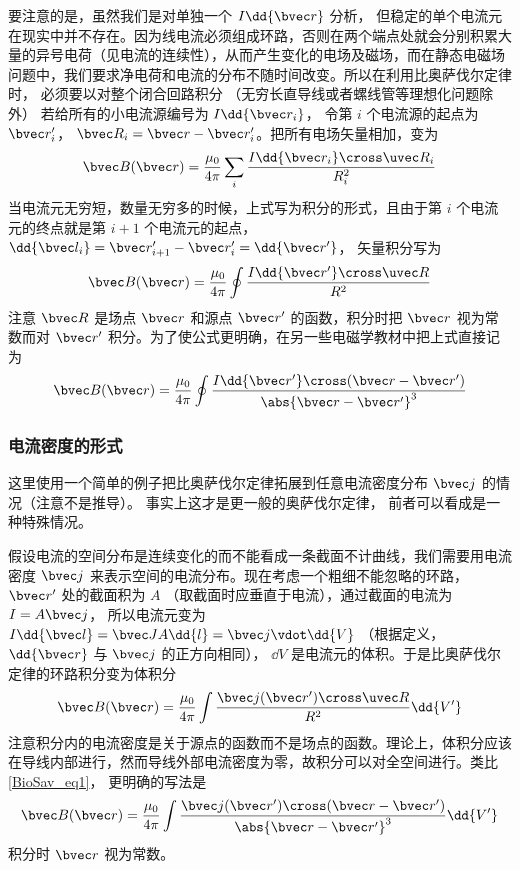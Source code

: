 要注意的是，虽然我们是对单独一个 $I\dd{\bvec r}$ 分析， 但稳定的单个电流元在现实中并不存在。因为线电流必须组成环路，否则在两个端点处就会分别积累大量的异号电荷（见电流的连续性），从而产生变化的电场及磁场，而在静态电磁场问题中，我们要求净电荷和电流的分布不随时间改变。所以在利用比奥萨伐尔定律时， 必须要以对整个闭合回路积分 （无穷长直导线或者螺线管等理想化问题除外）%
若给所有的小电流源编号为 $I\dd{\bvec r_i}$， 令第 $i$ 个电流源的起点为 $\bvec r'_i$， $\bvec R_i = \bvec r - \bvec r'_i$。把所有电场矢量相加，变为
\begin{equation}
\bvec B (\bvec r) = \frac{\mu_0}{4\pi} \sum\limits_i \frac{I \dd{\bvec r_i} \cross \uvec R_i}{R_i^2}
\end{equation}
当电流元无穷短，数量无穷多的时候，上式写为积分的形式，且由于第 $i$ 个电流元的终点就是第 $i+1$ 个电流元的起点， $\dd{\bvec l_i} = \bvec r'_{i + 1} - \bvec r'_i = \dd{\bvec r'}$， 矢量积分写为
\begin{equation}\label{BioSav_eq4}
\bvec B (\bvec r) = \frac{\mu_0}{4\pi} \oint \frac{I\dd{\bvec r'} \cross \uvec R}{R^2}
\end{equation}
注意 $\bvec R$ 是场点 $\bvec r$ 和源点 $\bvec r'$ 的函数，积分时把 $\bvec r$ 视为常数而对 $\bvec r'$ 积分。为了使公式更明确，在另一些电磁学教材中把上式直接记为
\begin{equation}\label{BioSav_eq1}
\bvec B(\bvec r) = \frac{\mu_0}{4\pi} \oint \frac{I \dd{\bvec r'} \cross (\bvec r - \bvec r')}{\abs{\bvec r - \bvec r'}^3}
\end{equation}


\subsubsection{电流密度的形式}
这里使用一个简单的例子把比奥萨伐尔定律拓展到任意电流密度分布 $\bvec j$ 的情况（注意不是推导）。 事实上这才是更一般的奥萨伐尔定律， 前者可以看成是一种特殊情况。

假设电流的空间分布是连续变化的而不能看成一条截面不计曲线，我们需要用电流密度 $\bvec j$ 来表示空间的电流分布。现在考虑一个粗细不能忽略的环路， $\bvec r'$ 处的截面积为 $A$ （取截面时应垂直于电流），通过截面的电流为 $I = A\bvec j$， 所以电流元变为 $I \dd{\bvec l} = \bvec JA \dd{l} = \bvec j \vdot \dd{V}$ （根据定义， $\dd{\bvec r}$ 与 $\bvec j$ 的正方向相同）， $\dd{V}$ 是电流元的体积。于是比奥萨伐尔定律的环路积分变为体积分
\begin{equation}
\bvec B(\bvec r) = \frac{\mu_0}{4\pi} \int \frac{\bvec j(\bvec r') \cross \uvec R}{R^2}\dd{V'}
\end{equation}
注意积分内的电流密度是关于源点的函数而不是场点的函数。理论上，体积分应该在导线内部进行，然而导线外部电流密度为零，故积分可以对全空间进行。类比\autoref{BioSav_eq1}， 更明确的写法是
\begin{equation}
\bvec B(\bvec r) = \frac{\mu_0}{4\pi} \int \frac{\bvec j(\bvec r') \cross (\bvec r - \bvec r')}{\abs{\bvec r - \bvec r'}^3} \dd{V'}
\end{equation}
积分时 $\bvec r$ 视为常数。

